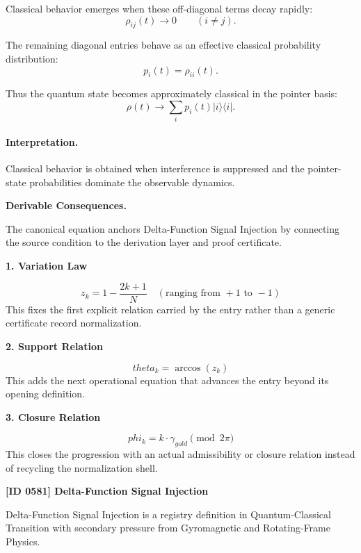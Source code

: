 Classical behavior emerges when these off-diagonal terms decay rapidly:
\begin{equation}
\rho_{ij}(t)\rightarrow 0
\qquad
(i\neq j).
\end{equation}

The remaining diagonal entries behave as an effective classical probability distribution:
\begin{equation}
p_i(t)=\rho_{ii}(t).
\end{equation}

Thus the quantum state becomes approximately classical in the pointer basis:
\begin{equation}
\boxed{
\rho(t)
\longrightarrow
\sum_i p_i(t)|i\rangle\langle i|.
}
\end{equation}

\paragraph{Interpretation.}
Classical behavior is obtained when interference is suppressed and the pointer-state probabilities dominate the observable dynamics.

\par\vspace{0.35em}
\noindent\textbf{Derivable Consequences.}\quad
\begingroup
\footnotesize
\raggedright
The canonical equation anchors Delta-Function Signal Injection by connecting the source condition to the derivation layer and proof certificate.
\par\endgroup

\noindent\textbf{1. Variation Law}\par
\[
z_k = 1 - \frac{2k+1}{N} \quad (\text{ranging from } +1 \text{ to } -1)
\]
\noindent This fixes the first explicit relation carried by the entry rather than a generic certificate record normalization.\par
\noindent\textbf{2. Support Relation}\par
\[
theta_k = \arccos(z_k)
\]
\noindent This adds the next operational equation that advances the entry beyond its opening definition.\par
\noindent\textbf{3. Closure Relation}\par
\[
phi_k = k \cdot \gamma_{gold} \pmod{2\pi}
\]
\noindent This closes the progression with an actual admissibility or closure relation instead of recycling the normalization shell.\par

\clearpage
\noindent\textbf{[ID 0581] Delta-Function Signal Injection}\par
\vspace{0.35em}
\begingroup\small
{}
Delta-Function Signal Injection is a registry definition in Quantum-Classical Transition with secondary pressure from Gyromagnetic and Rotating-Frame Physics.


